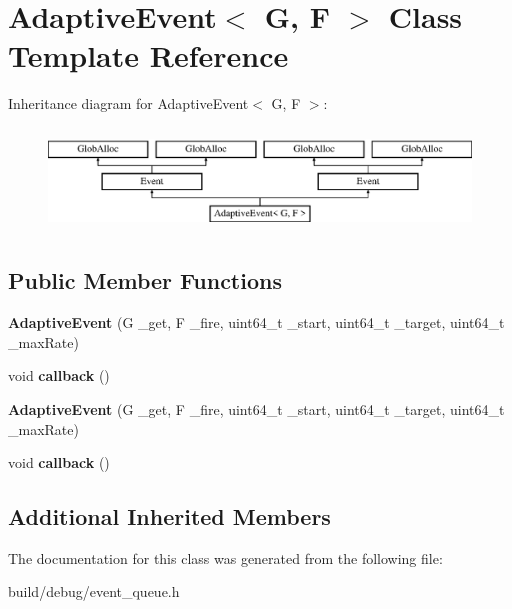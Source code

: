 \hypertarget{classAdaptiveEvent}{\section{Adaptive\-Event$<$ G, F $>$ Class Template Reference}
\label{classAdaptiveEvent}
}
Inheritance diagram for Adaptive\-Event$<$ G, F $>$\-:\begin{figure}[H]
\begin{center}
\leavevmode
\includegraphics[height=2.763158cm]{classAdaptiveEvent}
\end{center}
\end{figure}
\subsection*{Public Member Functions}
\begin{DoxyCompactItemize}
\item 
\hypertarget{classAdaptiveEvent_a7b471bbf4cc9e8e64e7e7e361e5d7d82}{{\bfseries Adaptive\-Event} (G \-\_\-get, F \-\_\-fire, uint64\-\_\-t \-\_\-start, uint64\-\_\-t \-\_\-target, uint64\-\_\-t \-\_\-max\-Rate)}\label{classAdaptiveEvent_a7b471bbf4cc9e8e64e7e7e361e5d7d82}

\item 
\hypertarget{classAdaptiveEvent_ad59239ff5a5a2284754edc3cdb42514e}{void {\bfseries callback} ()}\label{classAdaptiveEvent_ad59239ff5a5a2284754edc3cdb42514e}

\item 
\hypertarget{classAdaptiveEvent_a7b471bbf4cc9e8e64e7e7e361e5d7d82}{{\bfseries Adaptive\-Event} (G \-\_\-get, F \-\_\-fire, uint64\-\_\-t \-\_\-start, uint64\-\_\-t \-\_\-target, uint64\-\_\-t \-\_\-max\-Rate)}\label{classAdaptiveEvent_a7b471bbf4cc9e8e64e7e7e361e5d7d82}

\item 
\hypertarget{classAdaptiveEvent_ad59239ff5a5a2284754edc3cdb42514e}{void {\bfseries callback} ()}\label{classAdaptiveEvent_ad59239ff5a5a2284754edc3cdb42514e}

\end{DoxyCompactItemize}
\subsection*{Additional Inherited Members}


The documentation for this class was generated from the following file\-:\begin{DoxyCompactItemize}
\item 
build/debug/event\-\_\-queue.\-h\end{DoxyCompactItemize}

